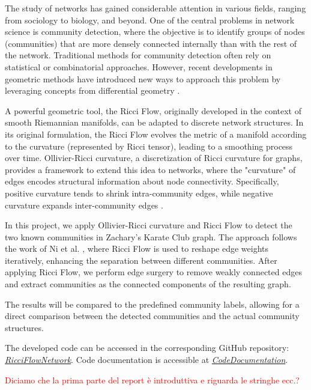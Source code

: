 The study of networks has gained considerable attention in various fields, ranging from sociology to biology, and beyond. One of the central problems in network science is community detection, where the objective is to identify groups of nodes (communities) that are more densely connected internally than with the rest of the network. Traditional methods for community detection often rely on statistical or combinatorial approaches. However, recent developments in geometric methods have introduced new ways to approach this problem by leveraging concepts from differential geometry \cite{Ni:communitydetectionnetworksricci}.

A powerful geometric tool, the Ricci Flow, originally developed in the context of smooth Riemannian manifolds, can be adapted to discrete network structures. In its original formulation, the Ricci Flow evolves the metric of a manifold according to the curvature (represented by Ricci tensor), leading to a smoothing process over time. Ollivier-Ricci curvature, a discretization of Ricci curvature for graphs, provides a framework to extend this idea to networks, where the "curvature" of edges encodes structural information about node connectivity. Specifically, positive curvature tends to shrink intra-community edges, while negative curvature expands inter-community edges \cite{Ni:communitydetectionnetworksricci}.

In this project, we apply Ollivier-Ricci curvature and Ricci Flow to detect the two known communities in Zachary’s Karate Club graph. The approach follows the work of Ni et al. \cite{Ni:communitydetectionnetworksricci}, where Ricci Flow is used to reshape edge weights iteratively, enhancing the separation between different communities. After applying Ricci Flow, we perform edge surgery to remove weakly connected edges and extract communities as the connected components of the resulting graph.

The results will be compared to the predefined community labels, allowing for a direct comparison between the detected communities and the actual community structures. 

The developed code can be accessed in the corresponding GitHub repository: \textit{\href{https://github.com/fabbri-lorenzo/RicciFlowNetwork}{RicciFlowNetwork}}.
Code documentation is accessible at \textit{\href{https://fabbri-lorenzo.github.io/RicciFlowNetwork/}{CodeDocumentation}}.

\textcolor{red}{Diciamo che la prima parte del report è introduttiva e riguarda le stringhe ecc.?}